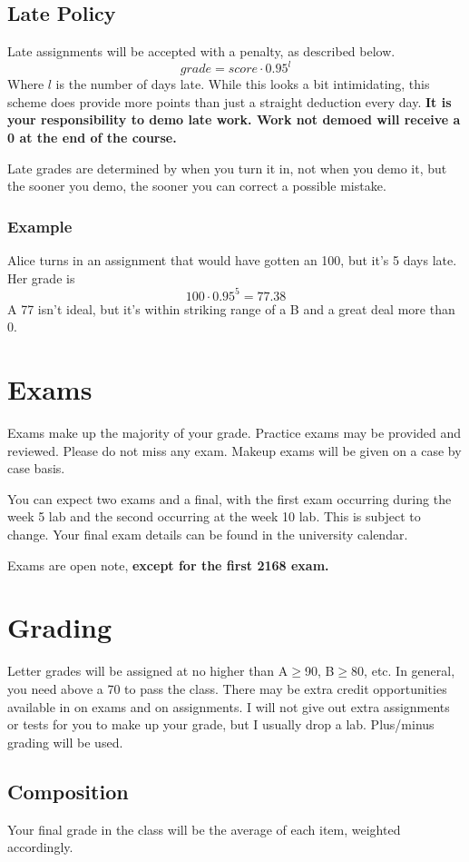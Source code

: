 \documentclass[10pt, letter]{article}
\begin{document}
\subsection*{Late Policy}
Late assignments will be accepted with a penalty, as described below.  $$grade = score \cdot 0.95^{l}$$
Where $l$ is the number of days late.  While this looks a bit intimidating, this scheme does provide more points than just a straight deduction every day. \textbf{It is your responsibility to demo late work.  Work not demoed will receive a 0 at the end of the course.}

Late grades are determined by when you turn it in, not when you demo it, but the sooner you demo, the sooner you can correct a possible mistake. 

\subsubsection*{Example}
Alice turns in an assignment that would have gotten an 100, but it's 5 days late.  Her grade is $$100\cdot 0.95^{5} = 77.38$$ A 77 isn't ideal, but it's within striking range of a B and a great deal more than 0.

\section{Exams}
Exams make up the majority of your grade.
Practice exams may be provided and reviewed.  
Please do not miss any exam.  
Makeup exams will be given on a case by case basis.


You can expect two exams and a final, with the first exam occurring during the week 5 lab and the second occurring at the week 10 lab.
This is subject to change.
Your final exam details can be found in the university calendar.

Exams are open note, \textbf{except for the first 2168 exam.}

\section*{Grading}

Letter grades will be assigned at no higher than A$\geq$90, B$\geq$80, etc.
In general, you need above a 70 to pass the class.
There may be extra credit opportunities available in on exams and on assignments.
I will not give out extra assignments or tests for you to make up your grade, but I usually drop a lab.
Plus/minus grading will be used.
\subsection*{Composition}
Your final grade in the class will be the average of each item, weighted accordingly.
\end{document}
